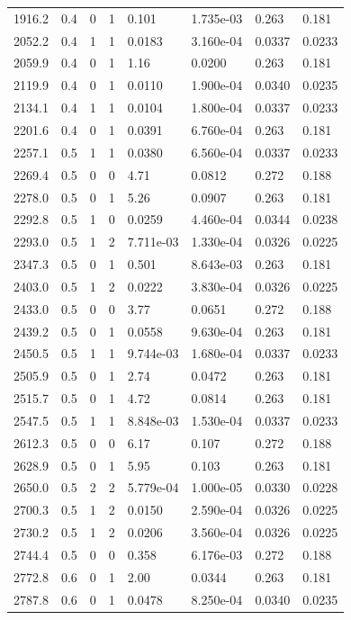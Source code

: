 \documentclass[preview]{standalone}
\begin{document}
{{{\begin{tabular}{L{1.2cm}C{1.2cm} C{0.3cm}C{0.5cm} C{1.4cm}C{1.4cm} C{1.4cm}C{1.4cm}}
  1916.2  &   0.4  & 0     &  1 &  0.101  & 1.735e-03  & 0.263 &  0.181   \\ 
  2052.2  &   0.4  & 1     &  1 &  0.0183  & 3.160e-04  & 0.0337 &  0.0233   \\ 
  2059.9  &   0.4  & 0     &  1 &  1.16  & 0.0200  & 0.263 &  0.181   \\ 
  2119.9  &   0.4  & 0     &  1 &  0.0110  & 1.900e-04  & 0.0340 &  0.0235   \\ 
  2134.1  &   0.4  & 1     &  1 &  0.0104  & 1.800e-04  & 0.0337 &  0.0233   \\ 
  2201.6  &   0.4  & 0     &  1 &  0.0391  & 6.760e-04  & 0.263 &  0.181   \\ 
  2257.1  &   0.5  & 1     &  1 &  0.0380  & 6.560e-04  & 0.0337 &  0.0233   \\ 
  2269.4  &   0.5  & 0     &  0 &  4.71  & 0.0812  & 0.272 &  0.188   \\ 
  2278.0  &   0.5  & 0     &  1 &  5.26  & 0.0907  & 0.263 &  0.181   \\ 
  2292.8  &   0.5  & 1     &  0 &  0.0259  & 4.460e-04  & 0.0344 &  0.0238   \\ 
  2293.0  &   0.5  & 1     &  2 &  7.711e-03  & 1.330e-04  & 0.0326 &  0.0225   \\ 
  2347.3  &   0.5  & 0     &  1 &  0.501  & 8.643e-03  & 0.263 &  0.181   \\ 
  2403.0  &   0.5  & 1     &  2 &  0.0222  & 3.830e-04  & 0.0326 &  0.0225   \\ 
  2433.0  &   0.5  & 0     &  0 &  3.77  & 0.0651  & 0.272 &  0.188   \\ 
  2439.2  &   0.5  & 0     &  1 &  0.0558  & 9.630e-04  & 0.263 &  0.181   \\ 
  2450.5  &   0.5  & 1     &  1 &  9.744e-03  & 1.680e-04  & 0.0337 &  0.0233   \\ 
  2505.9  &   0.5  & 0     &  1 &  2.74  & 0.0472  & 0.263 &  0.181   \\ 
  2515.7  &   0.5  & 0     &  1 &  4.72  & 0.0814  & 0.263 &  0.181   \\ 
  2547.5  &   0.5  & 1     &  1 &  8.848e-03  & 1.530e-04  & 0.0337 &  0.0233   \\ 
  2612.3  &   0.5  & 0     &  0 &  6.17  & 0.107  & 0.272 &  0.188   \\ 
  2628.9  &   0.5  & 0     &  1 &  5.95  & 0.103  & 0.263 &  0.181   \\ 
  2650.0  &   0.5  & 2     &  2 &  5.779e-04  & 1.000e-05  & 0.0330 &  0.0228   \\ 
  2700.3  &   0.5  & 1     &  2 &  0.0150  & 2.590e-04  & 0.0326 &  0.0225   \\ 
  2730.2  &   0.5  & 1     &  2 &  0.0206  & 3.560e-04  & 0.0326 &  0.0225   \\ 
  2744.4  &   0.5  & 0     &  0 &  0.358  & 6.176e-03  & 0.272 &  0.188   \\ 
  2772.8  &   0.6  & 0     &  1 &  2.00  & 0.0344  & 0.263 &  0.181   \\ 
  2787.8  &   0.6  & 0     &  1 &  0.0478  & 8.250e-04  & 0.0340 &  0.0235   \\ 
\hline 
\end{tabular} 

}}}
\end{document}
